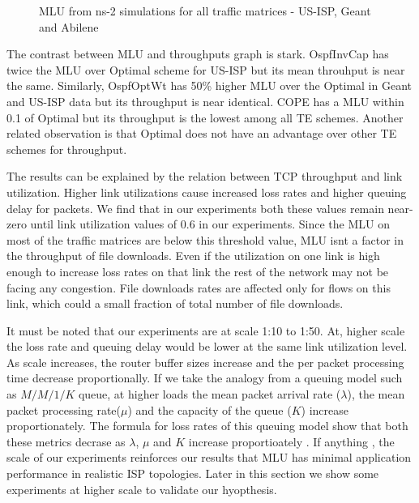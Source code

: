 \begin{figure*}[htb]
  \begin{center} 
  \end{center}
  \caption{MLU from ns-2 simulations for all traffic matrices - US-ISP, Geant and Abilene }
  \label{fig:All_ISPs_MLU}
\end{figure*}

The contrast between MLU and throughputs graph is stark. OspfInvCap has twice the MLU over Optimal scheme for US-ISP but its mean throuhput is near the same. Similarly, OspfOptWt has 50\% higher MLU over the  Optimal in Geant and US-ISP data but its throughput is near identical. COPE has a MLU within 0.1 of  Optimal but its throughput is the lowest among all TE schemes. Another related observation is that Optimal does not have an advantage over other TE schemes for throughput. %

The results can be explained by the relation between TCP throughput and link utilization. Higher link utilizations cause increased loss rates and higher queuing delay for packets. We find that in our experiments both these values remain near-zero until link utilization values of 0.6 in our experiments. Since the MLU on most of the traffic matrices are below this threshold value, MLU isnt a factor in the throughput of file downloads. Even if the utilization on one link is high enough to increase loss rates on that link the rest of the network may not be facing any congestion. File downloads rates are affected only for flows on this link, which could a small fraction of total number of file downloads.

It must be noted that our experiments are at scale 1:10 to 1:50. At, higher scale the loss rate and queuing delay would be lower at the same link utilization level. As scale increases, the router buffer sizes increase and the per packet processing time decrease proportionally. If we take the analogy from a queuing model such as $M/M/1/K$ queue, at higher loads the mean packet arrival rate ($\lambda$), the mean packet processing rate($\mu$) and the capacity of the queue ($K$) increase proportionately. The formula for loss rates of this queuing model show that both these metrics decrase as $\lambda$, $\mu$  and $K$ increase proportioately \cite{queue}. If anything , the scale of our experiments reinforces our results that MLU has minimal application performance in realistic ISP topologies. Later in this section we show some experiments at higher scale to validate our hyopthesis.

